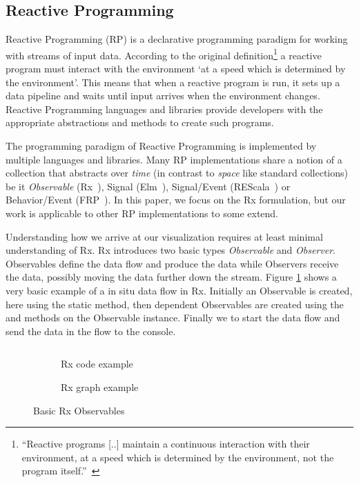 \subsection{Reactive Programming}
\label{nutshell}
Reactive Programming (RP) is a declarative programming paradigm for working with streams of input data. 
According to the original definition\footnote{
``Reactive programs [..] maintain a continuous interaction with their environment, at a speed which is determined by the environment, not the program itself.''~\cite{berry1989real}
} a reactive program must interact with the environment `at a speed which is determined by the environment'.
This means that when a reactive program is run, it sets up a data pipeline and waits until input arrives when the environment changes.
Reactive Programming languages and libraries provide developers with the appropriate abstractions and methods to create such programs.

The programming paradigm of Reactive Programming is implemented by multiple languages and libraries. Many RP implementations share a notion of a collection that abstracts over \textit{time} (in contrast to \textit{space} like standard collections) be it \textit{Observable} (Rx~\cite{meijer2010subject}), Signal (Elm~\cite{czaplicki2012elm}), Signal/Event (REScala~\cite{salvaneschi2014rescala}) or Behavior/Event (FRP~\cite{elliott1997functional}). In this paper, we focus on the Rx formulation, but our work is applicable to other RP implementations to some extend. 

Understanding how we arrive at our visualization requires at least minimal understanding of Rx.
Rx introduces two basic types \textit{Observable} and \textit{Observer}. Observables define the data flow and produce the data while Observers receive the data, possibly moving the data further down the stream. Figure \ref{sample1} shows a very basic example of a in situ data flow in Rx. Initially an Observable is created, here using the static  method, then dependent Observables are created using the  and  methods on the Observable instance. Finally we  to start the data flow and send the data in the flow to the console.

\begin{figure}

\begin{subfigure}[a]{\columnwidth}
\inputminted[tabsize=2]{javascript}{listings/sample1.js}	
\caption{Rx code example}
\label{sample1}
\end{subfigure}

\begin{subfigure}[b]{\columnwidth}
\centering

\caption{Rx graph example}
\label{chaincreate}
\end{subfigure}

\caption{Basic Rx  Observables}

\end{figure}

